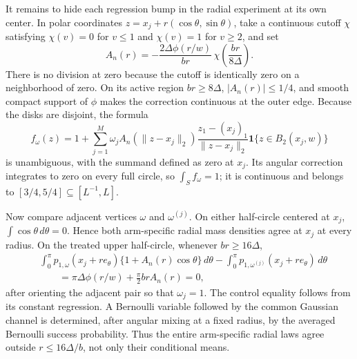 It remains to hide each regression bump in the radial experiment at its own center.  In polar coordinates \(z=x_j+r(\cos\theta,\sin\theta)\), take a continuous cutoff \(\chi\) satisfying \(\chi(v)=0\) for \(v\leq1\) and \(\chi(v)=1\) for \(v\geq2\), and set
\[
A_n(r)=-\frac{2\Delta\phi(r/w)}{br}\,
\chi\!\left(\frac{br}{8\Delta}\right).
\]
There is no division at zero because the cutoff is identically zero on a neighborhood of zero.  On its active region \(br\geq8\Delta\), \(\lvert A_n(r)\rvert\leq1/4\), and smooth compact support of \(\phi\) makes the correction continuous at the outer edge.  Because the disks are disjoint, the formula
\[
f_\omega(z)=1+\sum_{j=1}^M\omega_jA_n(\lVert z-x_j\rVert_2)
\frac{z_1-(x_j)_1}{\lVert z-x_j\rVert_2}
\mathbf1\{z\in B_2(x_j,w)\}
\]
is unambiguous, with the summand defined as zero at \(x_j\).  Its angular correction integrates to zero on every full circle, so \(\int_Sf_\omega=1\); it is continuous and belongs to \([3/4,5/4]\subseteq[L^{-1},L]\).

Now compare adjacent vertices \(\omega\) and \(\omega^{(j)}\).  On either half-circle centered at \(x_j\), \(\int\cos\theta\,d\theta=0\).  Hence both arm-specific radial mass densities agree at \(x_j\) at every radius.  On the treated upper half-circle, whenever \(br\geq16\Delta\),
\[
\begin{aligned}
&\int_0^\pi p_{1,\omega}(x_j+r e_\theta)\{1+A_n(r)\cos\theta\}\,d\theta
-\int_0^\pi p_{1,\omega^{(j)}}(x_j+r e_\theta)\,d\theta\\
&\qquad=\pi\Delta\phi(r/w)+\frac\pi2brA_n(r)=0,
\end{aligned}
\]
after orienting the adjacent pair so that \(\omega_j=1\).  The control equality follows from its constant regression.  A Bernoulli variable followed by the common Gaussian channel is determined, after angular mixing at a fixed radius, by the averaged Bernoulli success probability.  Thus the entire arm-specific radial laws agree outside \(r\leq16\Delta/b\), not only their conditional means.

